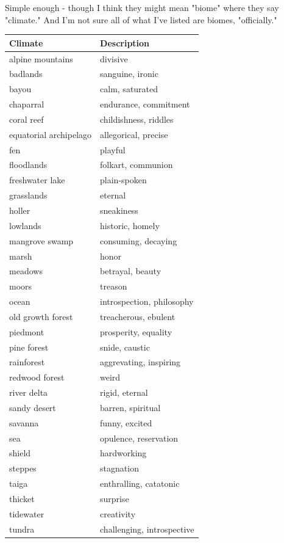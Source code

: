 \documentclass[11pt]{article}
\begin{document}
Simple enough - though I think they might mean "biome" where they say
"climate." And I'm not sure all of what I've listed are biomes,
"officially."

\begin{center}
\begin{tabular}{ll}
Climate & Description\\
\hline
alpine mountains & divisive\\
badlands & sanguine, ironic\\
bayou & calm, saturated\\
chaparral & endurance, commitment\\
coral reef & childishness, riddles\\
equatorial archipelago & allegorical, precise\\
fen & playful\\
floodlands & folkart, communion\\
freshwater lake & plain-spoken\\
grasslands & eternal\\
holler & sneakiness\\
lowlands & historic, homely\\
mangrove swamp & consuming, decaying\\
marsh & honor\\
meadows & betrayal, beauty\\
moors & treason\\
ocean & introspection, philosophy\\
old growth forest & treacherous, ebulent\\
piedmont & prosperity, equality\\
pine forest & snide, caustic\\
rainforest & aggrevating, inspiring\\
redwood forest & weird\\
river delta & rigid, eternal\\
sandy desert & barren, spiritual\\
savanna & funny, excited\\
sea & opulence, reservation\\
shield & hardworking\\
steppes & stagnation\\
taiga & enthralling, catatonic\\
thicket & surprise\\
tidewater & creativity\\
tundra & challenging, introspective\\
\end{tabular}
\end{center}
\end{document}

